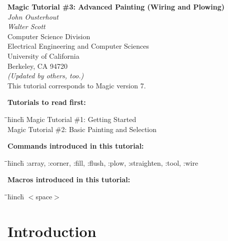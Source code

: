 \documentclass[letterpaper,twoside,12pt]{article}
\def\hinch{\hspace*{0.5in}}
\def\starti{\begin{center}\begin{tabbing}\hinch\=\hinch\=\hinch\=hinch\hinch\=\kill}
\def\endi{\end{tabbing}\end{center}}
\def\mytitle{Magic Tutorial \#3: Advanced Painting (Wiring and Plowing)}
\begin{document}
\makeatletter
\newcommand{\ps@magic}{%
	\renewcommand{\@oddhead}{\mytitle\hfil\today}%
	\renewcommand{\@evenhead}{\today\hfil\mytitle}%
	\renewcommand{\@evenfoot}{\hfil\textrm{--{\thepage}--}\hfil}%
	\renewcommand{\@oddfoot}{\@evenfoot}}
\newcommand{\ps@mplain}{%
	\renewcommand{\@oddhead}{}%
	\renewcommand{\@evenhead}{}%
	\renewcommand{\@evenfoot}{\hfil\textrm{--{\thepage}--}\hfil}%
	\renewcommand{\@oddfoot}{\@evenfoot}}
\makeatother
\pagestyle{magic}
\thispagestyle{mplain}


\begin{center}
  {\bfseries \Large \mytitle} \\
  \vspace*{0.5in}
  {\itshape John Ousterhout} \\
  {\itshape Walter Scott} \\
  \vspace*{0.5in}
   Computer Science Division \\
   Electrical Engineering and Computer Sciences \\
   University of California \\
   Berkeley, CA  94720 \\
  \vspace*{0.25in}
  {\itshape (Updated by others, too.)} \\
  \vspace*{0.25in}
  This tutorial corresponds to Magic version 7. \\
\end{center}
\vspace*{0.5in}

{\noindent\bfseries\large Tutorials to read first:}
\starti
   \> Magic Tutorial \#1: Getting Started \\
   \> Magic Tutorial \#2: Basic Painting and Selection
\endi

{\noindent\bfseries\large Commands introduced in this tutorial:}
\starti
   \> :array, :corner, :fill, :flush, :plow, :straighten, :tool, :wire
\endi

{\noindent\bfseries\large Macros introduced in this tutorial:}

\starti
   \> $<$space$>$
\endi

\vspace*{0.5in}
\section{Introduction}
\end{document}
